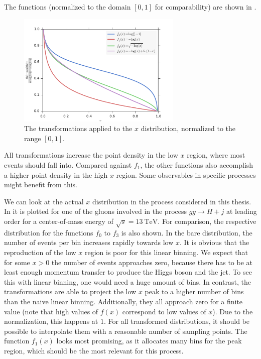 The functions (normalized to the domain $[0,1]$ for comparability) are shown in .
%
\begin{figure}[]
	\includegraphics[width=0.7\textwidth]{images/xtransform.pdf}
	\caption{The transformations applied to the $x$ distribution, normalized to the range $[0,1]$.}
	\label{fig:xtransform}
\end{figure}
%
All transformations increase the point density in the low $x$ region, where most events should fall into.
Compared against $f_1$, the other functions also accomplish a higher point density in the high $x$ region.
Some observables in specific processes might benefit from this.

We can look at the actual $x$ distribution in the process considered in this thesis.
In  it is plotted for one of the gluons involved in the process $gg \rightarrow H + j$ at leading order for a center-of-mass energy of $\sqrt{s} = \SI{13}{\tera\electronvolt}$.
For comparison, the respective distribution for the functions $f_0$ to $f_3$ is also shown.
In the bare distribution, the number of events per bin increases rapidly towards low $x$.
It is obvious that the reproduction of the low $x$ region is poor for this linear binning.
We expect that for some $x>0$ the number of events approaches zero, because there has to be at least enough momentum transfer to produce the Higgs boson and the jet.
To see this with linear binning, one would need a huge amount of bins.
In contrast, the transformations are able to project the low $x$ peak to a higher number of bins than the naive linear binning.
Additionally, they all approach zero for a finite value (note that high values of $f(x)$ correspond to low values of $x$).
Due to the normalization, this happens at $1$.
For all transformed distributions, it should be possible to interpolate them with a reasonable number of sampling points.
The function $f_1(x)$ looks most promising, as it allocates many bins for the peak region, which should be the most relevant for this process.

